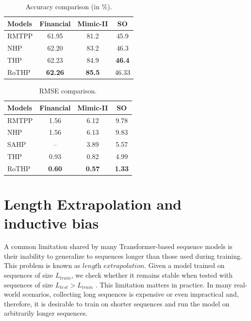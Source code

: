    \begin{table}[h]
        \centering
        \caption{Accuracy comparison (in \%).}
        \label{tab:rothp_accuracy}
        \begin{tabular}{lccc}
            \toprule
            \textbf{Models} & \textbf{Financial} & \textbf{Mimic-II} & \textbf{SO} \\
            \midrule
            RMTPP & 61.95 & 81.2 & 45.9  \\
            NHP   & 62.20 & 83.2 & 46.3  \\
            THP   & 62.23 & 84.9 & \textbf{46.4}  \\
            RoTHP & \textbf{62.26} & \textbf{85.5} & 46.33 \\
            \bottomrule
        \end{tabular}
    \end{table}

    \begin{table}[h]
        \centering
        \caption{RMSE comparison.}
        \label{tab:rothp_rmse}
        \begin{tabular}{lccc}
            \toprule
            \textbf{Models} & \textbf{Financial} & \textbf{Mimic-II} & \textbf{SO} \\
            \midrule
            RMTPP & 1.56 & 6.12 & 9.78 \\
            NHP   & 1.56 & 6.13 & 9.83 \\
            SAHP  & --   & 3.89 & 5.57 \\
            THP   & 0.93 & 0.82 & 4.99 \\
            RoTHP & \textbf{0.60} & \textbf{0.57} & \textbf{1.33} \\
            \bottomrule
        \end{tabular}
    \end{table}

\section{Length Extrapolation and inductive bias}\label{sec:length-extrapolation}

A common limitation shared by many Transformer-based sequence models is their inability to generalize to sequences longer than those used during training. This problem is known as $\textit{length extrapolation}$. Given a model trained on sequences of size $L_{train}$, we check whether it remains stable when tested with sequences of size $L_{test} > L_{train}$ \cite{press_train_2021}. This limitation matters in practice. In many real-world scenarios, collecting long sequences is expensive or even impractical and, therefore, it is desirable to train on shorter sequences and run the model on arbitrarily longer sequences.

